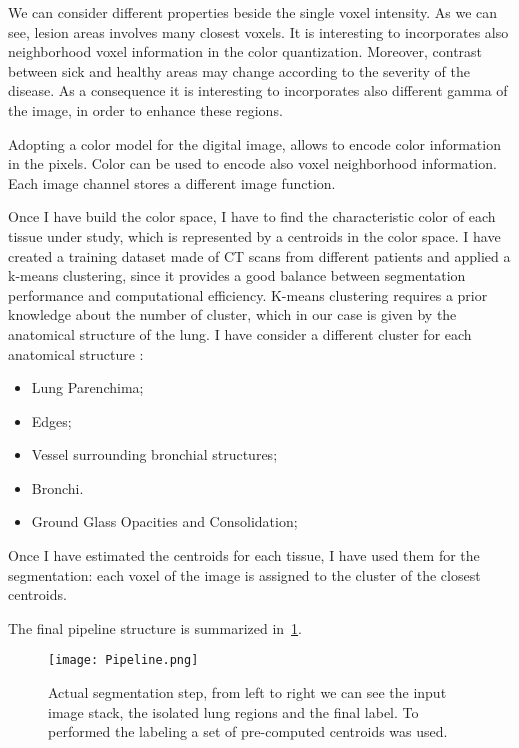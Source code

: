 \documentclass{standalone}
\begin{document}
	We can consider different properties beside the single voxel intensity. As we can see, lesion areas involves many closest voxels. It is interesting to incorporates also neighborhood voxel information in the color quantization. Moreover, contrast between sick and healthy areas may change according to the severity of the disease. As a consequence it is interesting to incorporates also different gamma of the image, in order to enhance these regions.
	
	Adopting a color model for the digital image, allows to encode color information in the pixels. Color can be used to encode also voxel neighborhood information. Each image channel stores a different image function.
	
	Once I have build the color space, I have to find the characteristic color of each tissue under study, which is represented by a centroids in the color space. I have created a training dataset made of CT scans from different patients and applied a  k-means clustering, since it provides a good balance between segmentation performance and computational efficiency. K-means clustering requires a prior knowledge about the number of cluster, which in our case is given by the anatomical structure of the lung. I have consider a different cluster for each anatomical structure : 
		\begin{itemize}
		\item Lung Parenchima; 
		
		\item  Edges;
		
		\item Vessel surrounding bronchial structures;
		
		\item Bronchi.
		
		\item  Ground Glass Opacities and Consolidation;
		
	\end{itemize}
		
	Once I have estimated the centroids for each tissue, I have used them for the  segmentation: each voxel of the image  is assigned  to the cluster of the closest centroids.
	
	The final pipeline structure is summarized in \figurename\,\ref{fig:Pipeline}.
	
	\begin{figure}[h!]
		\centering
		\texttt{[image: Pipeline.png]}
		\caption{Actual segmentation step, from left to right we can see the input image stack, the isolated lung regions and the final label. To performed the labeling a set of pre-computed centroids was used.}\label{fig:Pipeline}
	\end{figure}
\end{document}
